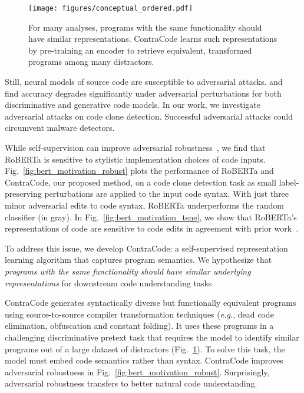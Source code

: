 \documentclass[11pt]{article}
\newcommand{\ours}[0]{ContraCode}
\begin{document}
\begin{figure}[t]
    \centering
    \texttt{[image: figures/conceptual\_ordered.pdf]}
    \caption{For many analyses, programs with the same functionality should have similar representations. \ours{} learns such representations by pre-training an encoder to retrieve equivalent, transformed programs among many distractors.}
    \label{fig:conceptual}
\end{figure}

Still, neural models of source code are susceptible to adversarial attacks. \citet{adversarial:yefet2020adversarial} and~\citet{adversarial:schuster2021you} find accuracy degrades significantly under adversarial perturbations for both discriminative and generative code models. In our work, we investigate adversarial attacks on code clone detection. Successful adversarial attacks could circumvent malware detectors.

While self-supervision can improve adversarial robustness~\cite{hendrycks2019selfsupervised}, we find that RoBERTa is sensitive to stylistic implementation choices of code inputs. Fig.~\ref{fig:bert_motivation_robust} plots the performance of RoBERTa and ContraCode, our proposed method, on a code clone detection task as small label-preserving perturbations are applied to the input code syntax. With just three minor adversarial edits to code syntax, RoBERTa underperforms the random classifier (in gray). In Fig.~\ref{fig:bert_motivation_tsne}, we show that RoBERTa's representations of code are sensitive to code edits in agreement with prior work~\cite{wang2019coset, wang2019learning, rabin2020evaluation}.


To address this issue, we develop \ours{}: a self-supervised representation learning algorithm that captures program semantics. We hypothesize that \emph{programs with the same functionality should have similar underlying representations} for downstream code understanding tasks.

\ours{} generates syntactically diverse but functionally equivalent programs using source-to-source compiler transformation techniques (\textit{e.g.}, dead code elimination, obfuscation and constant folding).
It uses these programs in a challenging discriminative pretext task that requires the model to identify similar programs out of a large dataset of distractors (Fig.~\ref{fig:conceptual}). 
To solve this task, the model must embed code semantics rather than syntax. 
\ours{} improves adversarial robustness in Fig.~\ref{fig:bert_motivation_robust}. Surprisingly, adversarial robustness transfers to better natural code understanding.
\end{document}
